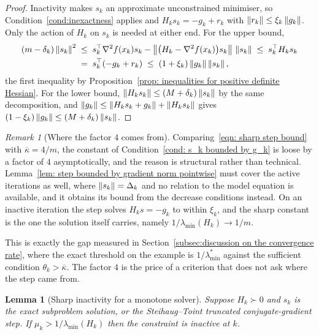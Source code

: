 \documentclass[11pt]{article}
\theoremstyle{plain}
\newtheorem{lemma}[theorem]{Lemma}
\theoremstyle{definition}
\theoremstyle{remark}
\newtheorem{remark}[theorem]{Remark}
\numberwithin{equation}{section}
\providecommand{\kbar}{\overline{\kappa}}
\providecommand{\kbar}{\overline{\kappa}}
\begin{document}
\begin{proof}
    Inactivity makes $s_k$ an approximate unconstrained minimiser, so
    Condition~\ref{cond:inexactness} applies and $H_k s_k = -g_k + r_k$ with
    $\left \lVert r_k \right \rVert \leq \xi_k\left \lVert g_k \right \rVert$. Only the action of $H_k$ on $s_k$ is needed at either end.
    For the upper bound,
    \begin{align*}
        (m - \delta_k)\left \lVert s_k \right \rVert^2
          &\;\leq\; s_k^\top \nabla^2 f(x_k) s_k
                  - \left \lVert \bigl(H_k - \nabla^2 f(x_k)\bigr)s_k \right \rVert\,\left \lVert s_k \right \rVert
           \;\leq\; s_k^\top H_k s_k \\
          &\;=\; s_k^\top(-g_k + r_k)
           \;\leq\; (1+\xi_k)\left \lVert g_k \right \rVert\left \lVert s_k \right \rVert ,
    \end{align*}
    the first inequality by Proposition~\ref{prop: inequalities for positive definite Hessian}.
    For the lower bound, $\left \lVert H_k s_k \right \rVert \leq (M + \delta_k)\left \lVert s_k \right \rVert$ by the same decomposition,
    and $\left \lVert g_k \right \rVert \leq \left \lVert H_k s_k + g_k \right \rVert + \left \lVert H_k s_k \right \rVert$ gives
    $(1-\xi_k)\left \lVert g_k \right \rVert \leq (M+\delta_k)\left \lVert s_k \right \rVert$.
\end{proof}

\begin{remark}[Where the factor $4$ comes from]
\label{rem: factor four}
    Comparing~\eqref{eqn: sharp step bound} with $\kbar = 4/m$, the constant of
    Condition~\ref{cond: s_k bounded by g_k} is loose by a factor of $4$ asymptotically, and the
    reason is structural rather than technical.
    Lemma~\ref{lem: step bounded by gradient norm pointwise} must cover the active iterations as
    well, where $\left \lVert s_k \right \rVert = \Delta_k$ and no relation to the model equation is available, and it
    obtains its bound from the decrease conditions instead. On an inactive iteration the step
    solves $H_k s = -g_k$ to within $\xi_k$, and the sharp constant is the one the solution
    itself carries, namely $1/\lambda_{\min}(H_k) \to 1/m$.

    This is exactly the gap measured in
    Section~\ref{subsec:discussion on the convergence rate}, where the exact threshold on the
    example is $1/\lambda^*_{\min}$ against the sufficient condition $\theta_k > \kbar$. The
    factor $4$ is the price of a criterion that does not ask where the step came from.
\end{remark}

\begin{lemma}[Sharp inactivity for a monotone solver]
\label{lem: sharp inactivity}
    Suppose $H_k \succ 0$ and $s_k$ is the exact subproblem solution, or the Steihaug--Toint
    truncated conjugate-gradient step. If
    $\mu_k > 1/\lambda_{\min}(H_k)$ then the constraint is inactive at $k$.
\end{lemma}
\end{document}
